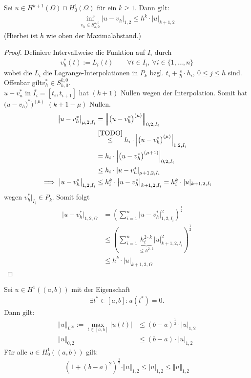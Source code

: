 \begin{theorem}\label{theorem4.2}\enter
Sei $u\in H^{k+1}(\Omega)\cap H^{1}_0(\Omega)$ für ein $k\geq1$. Dann gilt:
\begin{align*}
\inf\limits_{v_h\in S_{h,0}^{k,0}}\big|u-v_h\big|_{1,2}\leq h^k\cdot|u|_{k+1,2}
\end{align*}
(Hierbei ist $h$ wie oben der Maximalabstand.)
\end{theorem}
\begin{proof}
Definiere Intervallweise die Funktion auf $I_i$ durch
\begin{align*}
v_h^\ast(t):=L_i(t)\qquad\forall t\in I_i,~\forall i\in\lbrace1,\ldots,n\rbrace
\end{align*}
wobei die $L_i$ die Lagrange-Interpolationen in $P_k$ bzgl. $t_i+\frac{s}{h}\cdot h_i,~0\leq j\leq h$ sind.\\
Offenbar gilt$v_h^\ast\in S^{k,0}_{h,0}$. \\
$u-v_n^\ast$ in $\overline{I_i}=[t_i,t_{i+1}]$ hat $(k+1)$ Nullen wegen der Interpolation. Somit hat $\big(u-v_h)^\ast\big)^{(\mu)}$ $(k+1-\mu)$ Nullen.
\begin{align*}
\big|u-v_h^\ast\big|_{\mu,2,I_i}
&=\left\Vert \big(u-v_h^\ast\big)^{(\mu)}\right\Vert_{0,2,I_i}\\
&\stackrel{\ref{TODO}}{\leq}
h_i\cdot\left|\big(u-v_h^\ast\big)^{(\mu)}\right|_{1,2,I_i}\\
&=h_i\cdot\left|\big(u-v_h^\ast\big)^{(\mu+1)}\right|_{0,2,I_i}\\
&\leq h_i\cdot\left|u-v_h^\ast\right|_{\mu+1,2,I_i}\\
\implies
\big|u-v_h^\ast\big|_{1,2,I_i}
&\leq h_i^k\cdot\big|u-v_h^\ast\big|_{k+1,2,I_i}
=h_i^k\cdot |u|_{k+1,2,I_i}
\end{align*}
wegen $v_h^\ast\big|_{I_i}\in  P_k$. Somit folgt
\begin{align*}
\big| u-v_h^\ast\big|_{1,2,\Omega}
&=\left(\sum\limits_{i=1}^n\big|u-v_h^\ast\big|^2_{1,2,I_i}\right)^{\frac{1}{2}}\\
&\leq\left(\sum\limits_{i=1}^n \underbrace{h_i^{2\cdot k}}_{\leq h^{2\cdot k}} \big|u\big|^2_{k+1,2,I_i}\right)^{\frac{1}{2}}\\
&\leq h^k\cdot |u|_{k+1,2,\Omega}
\end{align*}
\end{proof}

\begin{lemma}\label{lemma4.3}
Sei $u\in H^1((a,b))$ mit der Eigenschaft
\begin{align*}
\exists t^\ast\in[a,b]:u(t^\ast)=0.
\end{align*}
Dann gilt:
\begin{align*}
\Vert  u\Vert_{L^\infty}:=\max\limits_{t\in [a,b]}\big|u(t)\big|&\leq(b-a)^{\frac{1}{2}}\cdot |u|_{1,2}\\
\Vert u\Vert_{0,2}&\leq(b-a)\cdot|u|_{1,2}
\end{align*}
Für alle $u\in H^1_0((a,b))$ gilt:
\begin{align*}
\left(1+(b-a)^2\right)^{\frac{1}{2}}\cdot\Vert u\Vert_{1,2}\leq|u|_{1,2}\leq\Vert u\Vert_{1,2}
\end{align*}
\end{lemma}

